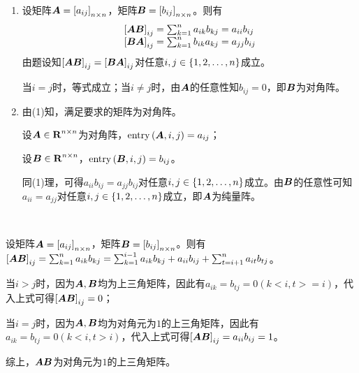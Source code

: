 \documentclass{ctexart}
\begin{document}
\begin{problem}\

\begin{enumerate}
    \item
          {
          设矩阵\(\boldsymbol{A}=\left[ a_{ij} \right]_{n\times n}\)，矩阵\(\boldsymbol{B}=\left[ b_{ij} \right]_{n\times n}\)。则有
          \begin{equation*}
              \begin{array}{lll}
                  \left[ \boldsymbol{A}\boldsymbol{B} \right]_{ij}=\sum_{k=1}^na_{ik}b_{kj}=a_{ii}b_{ij} \\
                  \left[ \boldsymbol{B}\boldsymbol{A} \right]_{ij}=\sum_{k=1}^nb_{ik}a_{kj}=a_{jj}b_{ij}
              \end{array}
          \end{equation*}
          由题设知\(\left[ \boldsymbol{A}\boldsymbol{B} \right]_{ij}=\left[ \boldsymbol{B}\boldsymbol{A} \right]_{ij}\)对任意\(i,j\in\left\{1,2,\dots,n \right\}\)成立。

          当\(i=j\)时，等式成立；当\(i\neq j\)时，由\(\boldsymbol{A}\)的任意性知\(b_{ij}=0\)，即\(\boldsymbol{B}\)为对角阵。
          }
    \item
          {
          由(1)知，满足要求的矩阵为对角阵。

          设\(\boldsymbol{A}\in\boldsymbol{\mathrm{R}}^{n\times n}\)为对角阵，\(\mathrm{entry}\left( \boldsymbol{A},i,j \right)=a_{ij}\)；

          设\(\boldsymbol{B}\in\boldsymbol{\mathrm{R}}^{n\times n}\)，\(\mathrm{entry}\left( \boldsymbol{B},i,j \right)=b_{ij}\)。

          同(1)理，可得\(a_{ii}b_{ij}=a_{jj}b_{ij}\)对任意\(i,j\in\left\{1,2,\dots,n \right\}\)成立。由\(\boldsymbol{B}\)的任意性可知\(a_{ii}=a_{jj}\)对任意\(i,j\in\left\{1,2,\dots,n \right\}\)成立，即\(\boldsymbol{A}\)为纯量阵。
          }
\end{enumerate}

\end{problem}

\begin{problem}\

设矩阵\(\boldsymbol{A}=\left[ a_{ij} \right]_{n\times n}\)，矩阵\(\boldsymbol{B}=\left[ b_{ij} \right]_{n\times n}\)。则有\(\left[ \boldsymbol{A}\boldsymbol{B} \right]_{ij}=\sum_{k=1}^na_{ik}b_{kj}=\sum_{k=1}^{i-1}a_{ik}b_{kj}+a_{ii}b_{ij}+\sum_{t=i+1}^na_{it}b_{tj}\)。

当\(i>j\)时，因为\(\boldsymbol{A},\boldsymbol{B}\)均为上三角矩阵，因此有\(a_{ik}=b_{tj}=0(k<i,t>=i)\)，代入上式可得\(\left[ \boldsymbol{A}\boldsymbol{B} \right]_{ij}=0\)；

当\(i=j\)时，因为\(\boldsymbol{A},\boldsymbol{B}\)均为对角元为\(1\)的上三角矩阵，因此有\(a_{ik}=b_{tj}=0(k<i,t>i)\)，代入上式可得\(\left[ \boldsymbol{A}\boldsymbol{B} \right]_{ij}=a_{ii}b_{ij}=1\)。

综上，\(\boldsymbol{A}\boldsymbol{B}\)为对角元为\(1\)的上三角矩阵。

\end{problem}
\end{document}

